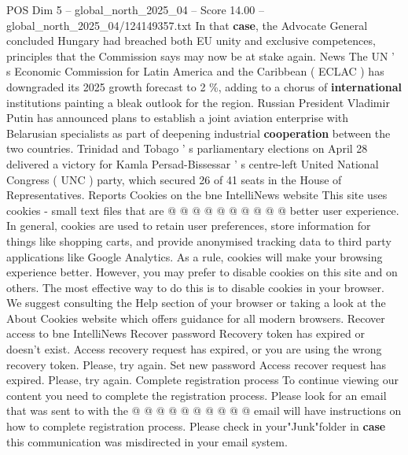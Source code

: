 \begin{textsample}{POS Dim 5 – global\_north\_2025\_04 – Score 14.00 – global\_north\_2025\_04/124149357.txt}
In that \textbf{case}, the Advocate General concluded Hungary had breached both EU unity and exclusive competences, principles that the Commission says may now be at stake again.
News The UN ' s Economic Commission for Latin America and the Caribbean ( ECLAC ) has downgraded its 2025 growth forecast to 2 \%, adding to a chorus of \textbf{international} institutions painting a bleak outlook for the region.
Russian President Vladimir Putin has announced plans to establish a joint aviation enterprise with Belarusian specialists as part of deepening industrial \textbf{cooperation} between the two countries.
Trinidad and Tobago ' s parliamentary elections on April 28 delivered a victory for Kamla Persad-Bissessar ' s centre-left United National Congress ( UNC ) party, which secured 26 of 41 seats in the House of Representatives.
Reports Cookies on the bne IntelliNews website This site uses cookies - small text files that are @ @ @ @ @ @ @ @ @ @ better user experience.
In general, cookies are used to retain user preferences, store information for things like shopping carts, and provide anonymised tracking data to third party applications like Google Analytics.
As a rule, cookies will make your browsing experience better.
However, you may prefer to disable cookies on this site and on others.
The most effective way to do this is to disable cookies in your browser.
We suggest consulting the Help section of your browser or taking a look at the About Cookies website which offers guidance for all modern browsers.
Recover access to bne IntelliNews Recover password Recovery token has expired or doesn't exist.
Access recovery request has expired, or you are using the wrong recovery token.
Please, try again.
Set new password Access recover request has expired.
Please, try again.
Complete registration process To continue viewing our content you need to complete the registration process.
Please look for an email that was sent to with the @ @ @ @ @ @ @ @ @ @ email will have instructions on how to complete registration process.
Please check in your"Junk"folder in \textbf{case} this communication was misdirected in your email system.

\end{textsample}
